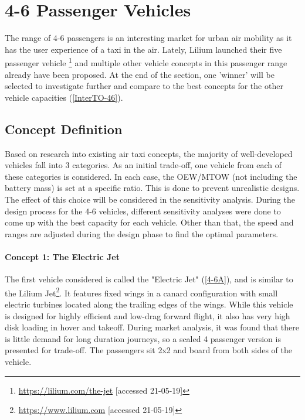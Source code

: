 \section{4-6 Passenger Vehicles}
\label{sc:4-6}
The range of 4-6 passengers is an interesting market for urban air mobility as it has the user experience of a taxi in the air. Lately, Lilium launched their five passenger vehicle \footnote{\url{https://lilium.com/the-jet} [accessed 21-05-19]} and multiple other vehicle concepts in this passenger range already have been proposed. At the end of the section, one 'winner' will be selected to investigate further and compare to the best concepts for the other vehicle capacities (\autoref{InterTO-46}). 

\subsection{Concept Definition}
Based on research into existing air taxi concepts, the majority of well-developed vehicles fall into 3 categories. As an initial trade-off, one vehicle from each of these categories is considered. In each case, the OEW/MTOW (not including the battery mass) is set at a specific ratio. This is done to prevent unrealistic designs. The effect of this choice will be considered in the sensitivity analysis. During the design process for the 4-6 vehicles, different sensitivity analyses were done to come up with the best capacity for each vehicle. Other than that, the speed and ranges are adjusted during the design phase to find the optimal parameters. 

\paragraph{Concept 1: The Electric Jet}
The first vehicle considered is called the "Electric Jet" (\autoref{4-6A}), and is similar to the Lilium Jet\footnote{\url{https://www.lilium.com} [accessed 21-05-19]}. It features fixed wings in a canard configuration with small electric turbines located along the trailing edges of the wings. While this vehicle is designed for highly efficient and low-drag forward flight, it also has very high disk loading in hover and takeoff. During market analysis, it was found that there is little demand for long duration journeys, so a scaled 4 passenger version is presented for trade-off. The passengers sit 2x2 and board from both sides of the vehicle.

